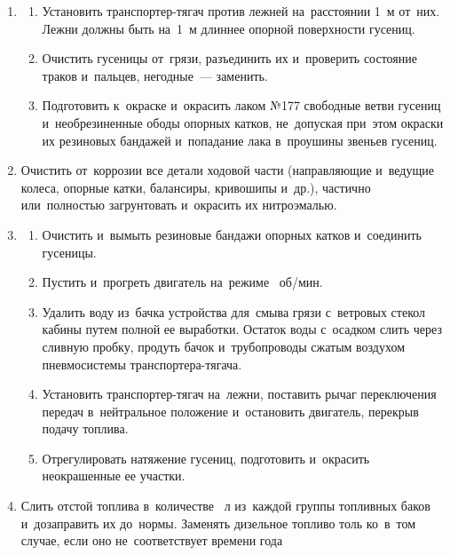 \begin{enumerate}
    \item \begin{enumerate}
        \item Установить транспортер-тягач против лежней на~расстоянии 1~м от~них. Лежни должны быть на~1~м длиннее опорной поверхности гусениц. 
        \item Очистить гусеницы от~грязи, разъединить их и~проверить состояние траков и~пальцев, негодные~--- заменить. 
        \item Подготовить к~окраске и~окрасить лаком №177 свободные ветви гусениц и~необрезиненные ободы опорных катков, не~допуская при~этом окраски их резиновых бандажей и~попадание лака в~проушины звеньев гусениц. 
    \end{enumerate}
            

    \item Очистить от~коррозии все детали ходовой части (направляющие и~ведущие колеса, опорные катки, балансиры, кривошипы и~др.), частично или~полностью загрунтовать и~окрасить их нитроэмалью.

    \item \begin{enumerate}
        \item Очистить и~вымыть резиновые бандажи опорных катков и~соединить гусеницы. 
            
        \item Пустить и~прогреть двигатель на~режиме ~об/мин. 
            
        \item Удалить воду из~бачка устройства для~смыва грязи с~ветровых стекол кабины путем полной ее выработки. Остаток воды с~осадком слить через сливную пробку, продуть бачок и~трубопроводы сжатым воздухом пневмосистемы транспортера-тягача. 
            
        \item Установить транспортер-тягач на~лежни, поставить рычаг переключения передач в~нейтральное положение и~остановить двигатель, перекрыв подачу топлива. 
            
        \item Отрегулировать натяжение гусениц, подготовить и~окрасить неокрашенные ее участки. 
    \end{enumerate}

    \item Слить отстой топлива в~количестве ~л из~каждой группы топливных баков и~дозаправить их до~нормы. Заменять дизельное топливо толь ко~в~том случае, если оно не~соответствует времени года 


\end{enumerate}
